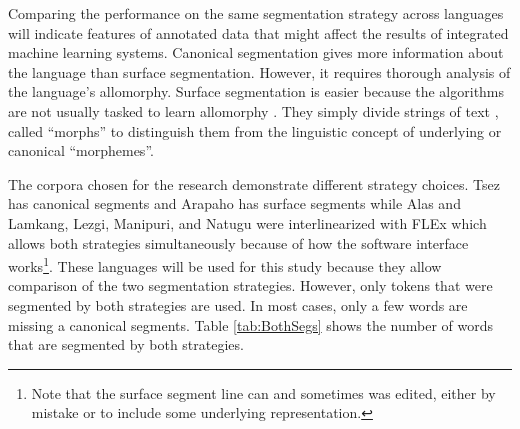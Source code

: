 Comparing the performance on the same segmentation strategy across languages will indicate features of annotated data that might affect the results of integrated machine learning systems. Canonical segmentation gives more information about the language than surface segmentation. However, it requires thorough analysis of the language's allomorphy. 
Surface segmentation is easier because the algorithms are not usually tasked to learn allomorphy \citep{goldsmith_computational_2017}. They simply divide strings of text \citep{virpioja_empirical_2011}, called ``morphs'' to distinguish them from the linguistic concept of underlying or canonical ``morphemes''. 


The corpora chosen for the research demonstrate different strategy choices.  Tsez has canonical segments and Arapaho has surface segments while Alas and Lamkang, Lezgi, Manipuri, and Natugu were interlinearized with FLEx which allows both strategies simultaneously because of how the software interface works\footnote{Note that the surface segment line can and sometimes was edited, either by mistake or to include some underlying representation.}. These languages will be used for this study because they allow comparison of the two segmentation strategies. However, only tokens that were segmented by both strategies are used. In most cases, only a few words are missing a canonical segments. Table \ref{tab:BothSegs} shows the number of words that are segmented by both strategies. 

